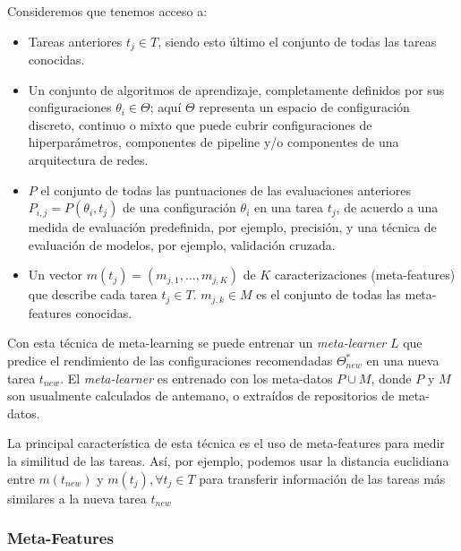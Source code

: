 \begin{definition}
Consideremos que tenemos acceso a:

\begin{itemize}
	\item Tareas anteriores $t_j \in T$, siendo esto último el conjunto de todas las tareas conocidas.
	\item Un conjunto de algoritmos de aprendizaje, completamente definidos por sus configuraciones $\theta_i \in \Theta$; aquí $\Theta$ representa un espacio de configuración discreto, continuo o mixto que puede cubrir configuraciones de hiperparámetros, componentes de pipeline y/o componentes de una arquitectura de redes.
	\item $P$ el conjunto de todas las puntuaciones de las evaluaciones anteriores $P_{i,j} = P(\theta_i, t_j)$ de una configuración $\theta_i$ en una tarea $t_j$, de acuerdo a una medida de evaluación predefinida, por ejemplo, precisión, y una técnica de evaluación de modelos, por ejemplo, validación cruzada. 
	\item Un vector $m(t_j) = (m_{j,1}, …, m_{j,K})$ de $K$ caracterizaciones (meta-features) que describe cada tarea $t_j \in T$. $m_{j,k} \in M$ es el conjunto de todas las meta-features conocidas.
\end{itemize}

Con esta técnica de meta-learning se puede entrenar un \emph{meta-learner} $L$ que predice el rendimiento de las configuraciones recomendadas $\Theta^*_{new}$ en una nueva tarea $t_{new}$. El \emph{meta-learner} es entrenado con los meta-datos $P\cup M$, donde $P$ y $M$ son usualmente calculados de antemano, o extraídos de repositorios de meta-datos.

\end{definition}

La principal característica de esta técnica es el uso de meta-features para medir la similitud de las tareas. Así, por ejemplo, podemos usar la distancia euclidiana entre $m(t_{new})$ y $m(t_j), \forall t_j \in T$ para transferir información de las tareas más similares a la nueva tarea $t_{new}$


\subsubsection{Meta-Features}

